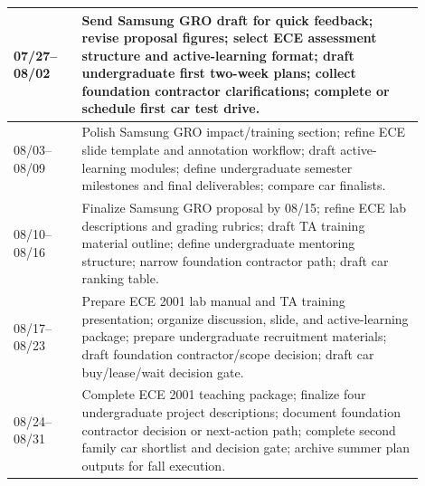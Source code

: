 \documentclass[custom, sidenote, final]{cls/oneproposal}
\begin{document}
\begin{longtable}{m{0.15\linewidth} p{0.75\linewidth}}
    07/27--08/02  &
    Send Samsung GRO draft for quick feedback; revise proposal figures; select ECE assessment structure and active-learning format; draft undergraduate first two-week plans; collect foundation contractor clarifications; complete or schedule first car test drive. \\
    \midrule

    08/03--08/09  &
    Polish Samsung GRO impact/training section; refine ECE slide template and annotation workflow; draft active-learning modules; define undergraduate semester milestones and final deliverables; compare car finalists.                                              \\
    \midrule

    08/10--08/16  &
    Finalize Samsung GRO proposal by 08/15; refine ECE lab descriptions and grading rubrics; draft TA training material outline; define undergraduate mentoring structure; narrow foundation contractor path; draft car ranking table.                                 \\
    \midrule

    08/17--08/23  &
    Prepare ECE 2001 lab manual and TA training presentation; organize discussion, slide, and active-learning package; prepare undergraduate recruitment materials; draft foundation contractor/scope decision; draft car buy/lease/wait decision gate.                \\
    \midrule

    08/24--08/31  &
    Complete ECE 2001 teaching package; finalize four undergraduate project descriptions; document foundation contractor decision or next-action path; complete second family car shortlist and decision gate; archive summer plan outputs for fall execution.         \\
\end{longtable}
\endgroup
\end{document}
